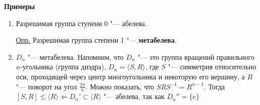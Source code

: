 \documentclass{article}
\begin{document}
\textbf{Примеры}
\begin{enumerate}
	\item Разрешимая группа ступени 0 "--- абелева.
	
	\underline{Опр.} Разрешимая группа степени 1 "--- \textbf{метабелева}.
	
	\item $D_n$ "--- метабелева. Напомним, что $D_n$ "--- это группа вращений правильного $n$-угольника (группа диэдра). $D_n = \langle S, R \rangle$, где $S$ "--- симметрия относительно оси, проходящей через центр многоугольника и некоторую его вершину, а $R$ "--- поворот на угол $\frac{2\pi}{n}$. Можно показать, что $SRS^{-1} = R^{n-1}$. Тогда $[S, R] \leq \langle R \rangle \Leftarrow D_n' \subset \langle R \rangle$ "--- абелева, так как $D_n'' = \{e\}$ 
\end{enumerate}
\end{document}
